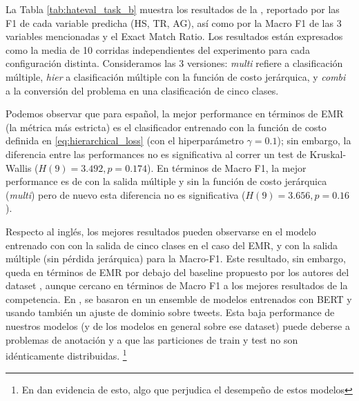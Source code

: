 La Tabla \ref{tab:hateval_task_b} muestra los resultados de la \subtaskb{}, reportado por las F1 de cada variable predicha (HS, TR, AG), así como por la Macro F1 de las 3 variables mencionadas y el Exact Match Ratio. Los resultados están expresados como la media de 10 corridas independientes del experimento para cada configuración distinta. Consideramos las 3 versiones: \emph{multi} refiere a clasificación múltiple, \emph{hier} a clasificación múltiple con la función de costo jerárquica, y \emph{combi} a la conversión del problema en una clasificación de cinco clases.

Podemos observar que para español, la mejor performance en términos de EMR (la métrica más estricta) es el clasificador entrenado con la función de costo definida en \ref{eq:hierarchical_loss} (con el hiperparámetro $\gamma = 0.1$); sin embargo, la diferencia entre las performances no es significativa al correr un test de Kruskal-Wallis ($H(9) = 3.492, p = 0.174$). En términos de Macro F1, la mejor performance es de \beto{} con la salida múltiple y sin la función de costo jerárquica (\emph{multi}) pero de nuevo esta diferencia no es significativa ($H(9) = 3.656, p=0.16$).

Respecto al inglés, los mejores resultados pueden observarse en el modelo entrenado con \bertweet{} con la salida de cinco clases en el caso del EMR, y con la salida múltiple (sin pérdida jerárquica) para la Macro-F1. Este resultado, sin embargo, queda en términos de EMR por debajo del baseline propuesto por los autores del dataset \cite{hateval2019semeval}, aunque cercano en términos de Macro F1 a los mejores resultados de la competencia. En \citet{gertner-etal-2019-mitre}, se basaron en un ensemble de modelos entrenados con BERT y usando también un ajuste de dominio sobre tweets. Esta baja performance de nuestros modelos (y de los modelos en general sobre ese dataset) puede deberse a problemas de anotación y a que las particiones de train y test no son idénticamente distribuidas. \footnote{En \citet{gertner-etal-2019-mitre} dan evidencia de esto, algo que perjudica el desempeño de estos modelos}



